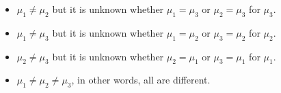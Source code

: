 \begin{itemize}
	\item $\mu_1 \neq \mu_2$ but it is unknown whether $\mu_1=\mu_3$ or $\mu_2=\mu_3$ for $\mu_3$.
	\item $\mu_1 \neq \mu_3$ but it is unknown whether $\mu_1=\mu_2$ or $\mu_3=\mu_2$ for $\mu_2$.
	\item $\mu_2 \neq \mu_3$ but it is unknown whether $\mu_2=\mu_1$ or $\mu_3=\mu_1$ for $\mu_1$.
	\item $\mu_1 \neq \mu_2 \neq \mu_3$, in other words, all are different.
\end{itemize}
